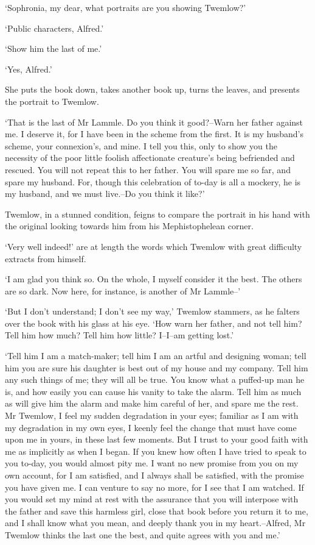 ‘Sophronia, my dear, what portraits are you showing Twemlow?’

‘Public characters, Alfred.’

‘Show him the last of me.’

‘Yes, Alfred.’

She puts the book down, takes another book up, turns the leaves, and
presents the portrait to Twemlow.

‘That is the last of Mr Lammle. Do you think it good?--Warn her father
against me. I deserve it, for I have been in the scheme from the first.
It is my husband’s scheme, your connexion’s, and mine. I tell you this,
only to show you the necessity of the poor little foolish affectionate
creature’s being befriended and rescued. You will not repeat this to her
father. You will spare me so far, and spare my husband. For, though this
celebration of to-day is all a mockery, he is my husband, and we must
live.--Do you think it like?’

Twemlow, in a stunned condition, feigns to compare the portrait in his
hand with the original looking towards him from his Mephistophelean
corner.

‘Very well indeed!’ are at length the words which Twemlow with great
difficulty extracts from himself.

‘I am glad you think so. On the whole, I myself consider it the best.
The others are so dark. Now here, for instance, is another of Mr
Lammle--’

‘But I don’t understand; I don’t see my way,’ Twemlow stammers, as he
falters over the book with his glass at his eye. ‘How warn her father,
and not tell him? Tell him how much? Tell him how little? I--I--am
getting lost.’

‘Tell him I am a match-maker; tell him I am an artful and designing
woman; tell him you are sure his daughter is best out of my house and my
company. Tell him any such things of me; they will all be true. You know
what a puffed-up man he is, and how easily you can cause his vanity to
take the alarm. Tell him as much as will give him the alarm and make
him careful of her, and spare me the rest. Mr Twemlow, I feel my sudden
degradation in your eyes; familiar as I am with my degradation in my own
eyes, I keenly feel the change that must have come upon me in yours,
in these last few moments. But I trust to your good faith with me as
implicitly as when I began. If you knew how often I have tried to speak
to you to-day, you would almost pity me. I want no new promise from you
on my own account, for I am satisfied, and I always shall be satisfied,
with the promise you have given me. I can venture to say no more, for
I see that I am watched. If you would set my mind at rest with the
assurance that you will interpose with the father and save this harmless
girl, close that book before you return it to me, and I shall know what
you mean, and deeply thank you in my heart.--Alfred, Mr Twemlow thinks
the last one the best, and quite agrees with you and me.’

